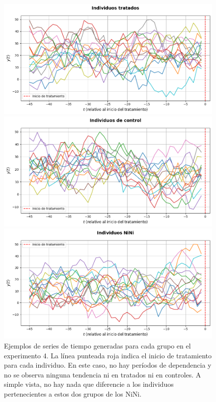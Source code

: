 \documentclass[../../main.tex]{subfiles}
\begin{document}
\begin{figure}[H]
    \centering
    \begin{minipage}{0.48\textwidth}
        \centering
        \includegraphics[scale=0.3]{figs/Exp4/tratados_sim13.png}
    \end{minipage}
    \hfill
    \begin{minipage}{0.48\textwidth}
        \centering
        \includegraphics[scale=0.3]{figs/Exp4/controles_sim13.png}
    \end{minipage}
    \vspace{0.5em}
    \begin{minipage}{0.6\textwidth}
        \centering
        \includegraphics[scale=0.3]{figs/Exp4/ninis_sim13.png}
    \end{minipage}
    \caption{Ejemplos de series de tiempo generadas para cada grupo en el experimento 4.
    La línea punteada roja indica el inicio de tratamiento para cada individuo. En este
    caso, no hay períodos de dependencia y no se observa ninguna tendencia ni en tratados
    ni en controles. A simple vista, no hay nada que diferencie a los individuos
    pertenecientes a estos dos grupos de los NiNi.}
    \label{fig:time_series_exp4}
\end{figure}
\end{document}
